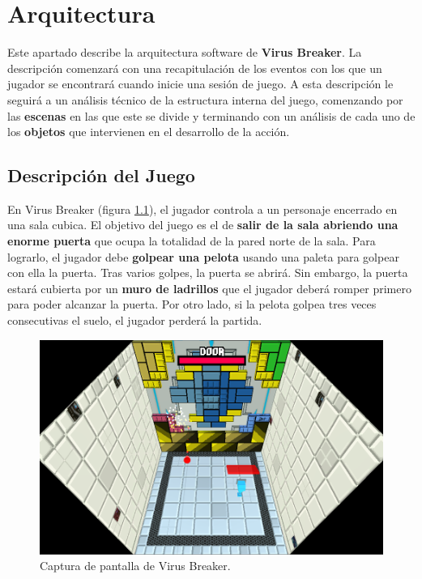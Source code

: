 \chapter{Arquitectura}
\label{Arquitectura}
Este apartado describe la arquitectura software de \textbf{Virus Breaker}. La descripción comenzará con una recapitulación de los eventos con los que un jugador se encontrará cuando inicie una sesión de juego. A esta descripción le seguirá a un análisis técnico de la estructura interna del juego, comenzando por las \textbf{escenas} en las que este se divide y terminando con un análisis de cada uno de los \textbf{objetos} que intervienen en el desarrollo de la acción.

\section{Descripción del Juego}
En Virus Breaker (figura \ref{juego}), el jugador controla a un personaje encerrado en una sala cubica. El objetivo del juego es el de \textbf{salir de la sala abriendo una enorme puerta} que ocupa la totalidad de la pared norte de la sala. Para lograrlo, el jugador debe \textbf{golpear una pelota} usando una paleta para golpear con ella la puerta. Tras varios golpes, la puerta se abrirá. Sin embargo, la puerta estará cubierta por un \textbf{muro de ladrillos} que el jugador deberá romper primero para poder alcanzar la puerta. Por otro lado, si la pelota golpea tres veces consecutivas el suelo, el jugador perderá la partida.
\begin{figure}[!t]
    \centering
    \includegraphics[width=1\textwidth]{images/estructura/descripcion/juego}
    \caption{Captura de pantalla de Virus Breaker.}
    \label{juego}
\end{figure}

